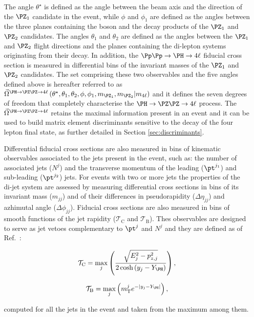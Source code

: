 The angle $\theta^\star$ is defined as the angle between the beam axis and the direction of the $\PZ_1$ candidate in the event, while $\phi$ and $\phi_1$ are defined as the angles between the three planes containing the \PH boson and the decay products of the $\PZ_1$ and $\PZ_2$ candidates. 
The angles $\theta_1$ and $\theta_2$ are defined as the angles between the $\PZ_1$ and $\PZ_2$ flight directions and the planes containing the di-lepton systems originating from their decay.
In addition, the $\Pp\Pp\to\Hllll$ fiducial cross section is measured in differential bins of the invariant masses of the $\PZ_1$ and $\PZ_2$ candidates.
The set comprising these two observables and the five angles defined above is hereafter referred to as $\vec\Omega^{\HZZfl}\left(\theta^\star,\theta_1,\theta_2,\phi,\phi_1,m_{\PZ_1},m_{\PZ_2}| m_{4\ell}\right)$ and it defines the seven degrees of freedom that completely characterise the $\HZZfl$ process.
The $\vec\Omega^{\HZZfl}$ retains the maximal information present in an event and it can be used to build matrix element discriminants sensitive to the decay of the four lepton final state, as further detailed in Section \ref{sec:discriminants}.

Differential fiducial cross sections are also measured in bins of kinematic observables associated to the jets present in the event, such as: the number of associated jets ($N^{j}$) and the transverse momentum of the leading ($\pt^{j_1}$) and sub-leading ($\pt^{j_2}$) jets.
For events with two or more jets the properties of the di-jet system are assessed by measuring differential cross sections in bins of its invariant mass ($m_{jj}$) and of their differences in pseudorapidity ($\Delta\eta_{jj}$) and azhimutal angle ($\Delta\phi_{jj}$). 
Fiducial cross sections are also measured in bins of smooth functions of the jet rapidity ($\mathcal{T}_{\text{C}}$ and $\mathcal{T}_{\text{B}}$). Thes observables are designed to serve as jet vetoes complementary to $\pt^{j}$ and $N^{j}$ and they are defined as of Ref.~\cite{Gangal:2014qda}:
\begin{linenomath*}
	\begin{equation}
	\label{eqn:tauC}
	\mathcal{T}_{\text{C}} = \max_{j}\left(\frac{\sqrt{E^2_j-p_{z,j}^2}}{2\cosh\left(y_j-Y_\PH\right)}\right),
	\end{equation}
\end{linenomath*}
\begin{linenomath*}
	\begin{equation}
		\label{eqn:tauB}
		\mathcal{T}_{\text{B}} = \max_{j}\left(m^j_{\text{T}}e^{-\mid y_j-Y_\PH\mid}\right),
	\end{equation}
\end{linenomath*}
computed for all the jets in the event and taken from the maximum among them.

